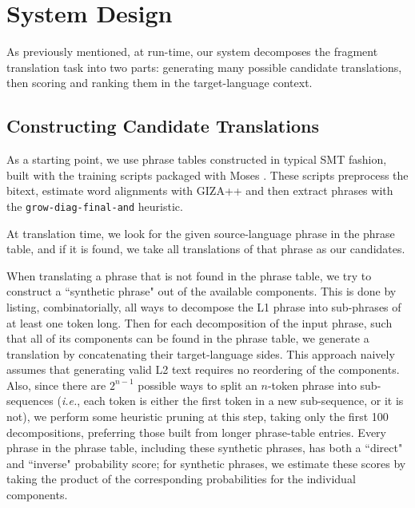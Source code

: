 \documentclass[11pt]{article}
\begin{document}

\section{System Design}
\label{sec:system}

As previously mentioned, at run-time, our system decomposes the fragment
translation task into two parts: generating many possible candidate
translations, then scoring and ranking them in the target-language context.

\subsection{Constructing Candidate Translations}
\label{sec:candidates}

As a starting point, we use phrase tables constructed in typical SMT fashion,
built with the training scripts packaged with Moses \cite{koehn:hoang:ea:07}.
These scripts preprocess the bitext, estimate word alignments with GIZA++
\cite{och:ney:00} and then extract phrases with the
\texttt{grow-diag-final-and} heuristic. 

At translation time, we look for the given source-language phrase in the phrase
table, and if it is found, we take all translations of that phrase as our
candidates.

When translating a phrase that is not found in the
phrase table, we try to construct a ``synthetic phrase" out of the available
components. This is done by listing, combinatorially, all ways to decompose the
L1 phrase into sub-phrases of at least one token long. Then for each
decomposition of the input phrase, such that all of its components can be found
in the phrase table, we generate a translation by concatenating their
target-language sides. This approach naively assumes that generating valid L2
text requires no reordering of the components. Also, since there are $2^{n-1}$
possible ways to split an $n$-token phrase into sub-sequences (\textit{i.e.},
each token is either the first token in a new sub-sequence, or it is not), we
perform some heuristic pruning at this step, taking only the first 100
decompositions, preferring those built from longer phrase-table entries. Every
phrase in the phrase table, including these synthetic phrases, has both a
``direct" and ``inverse" probability score; for synthetic phrases, we estimate
these scores by taking the product of the corresponding probabilities for the
individual components.
\end{document}
